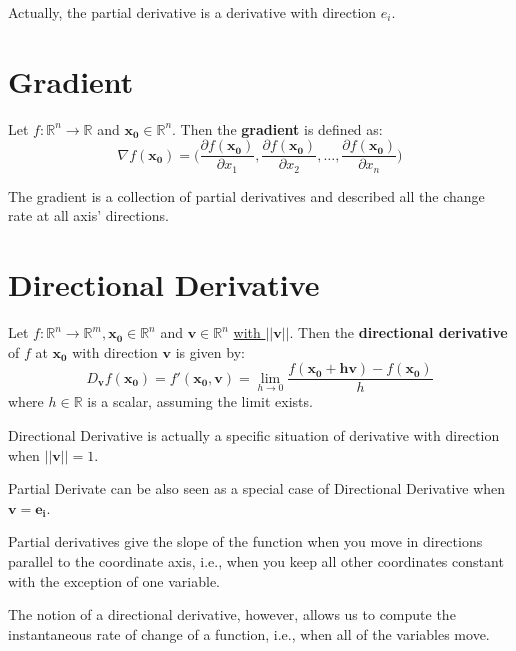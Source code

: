 \begin{remark*}
    Actually, the partial derivative is a derivative with direction $e_i$.
\end{remark*}
\section{Gradient}

\begin{definition}[Gradient]
    Let $f: \mathbb{R}^{n} \to \mathbb{R}$ and $\mathbf{x_0} \in \mathbb{R}^{n}$. Then the \textbf{gradient} is defined as: \[
        \nabla f(\mathbf{x_0}) = \Big(\frac{\partial f(\mathbf{x_0})}{\partial x_1}, \frac{\partial f(\mathbf{x_0})}{\partial x_2},\dots,\frac{\partial f(\mathbf{x_0})}{\partial x_n}\Big)
    \]
\end{definition}
\begin{remark*}
    The gradient is a collection of partial derivatives and described all the change rate at all axis' directions.
\end{remark*}

\section{Directional Derivative}

\begin{definition}
    Let $f: \mathbb{R}^{n}\to \mathbb{R}^{m}, \mathbf{x_0}\in \mathbb{R}^{n}$ and $\mathbf{v}\in \mathbb{R}^{n}$ \underline{with $||\mathbf{v}||$}. Then the \textbf{directional derivative} of $f$ at $\mathbf{x_0}$ with direction $\mathbf{v}$ is given by: \[
        D_\mathbf{v}f(\mathbf{x_0}) =f'(\mathbf{x_0},\mathbf{v}) = \lim_{h \to 0} \frac{f(\mathbf{x_0+h \mathbf{v}})-f(\mathbf{x_0})}{h}
    \]
    where $h \in \mathbb{R}$ is a scalar, assuming the limit exists.
\end{definition}

\begin{remark*}
    Directional Derivative is actually a specific situation of derivative with direction when $||\mathbf{v}||=1$.

    Partial Derivate can be also seen as a special case of Directional Derivative when $\mathbf{v} = \mathbf{e_i}$.
\end{remark*}

\begin{remark*}
    Partial derivatives give the slope of the function when you move in directions parallel to the coordinate axis, i.e., when you keep all other coordinates constant with the exception of one variable.

    The notion of a directional derivative, however, allows us to compute the instantaneous rate of change of a function, i.e., when all of the variables move.
\end{remark*}

